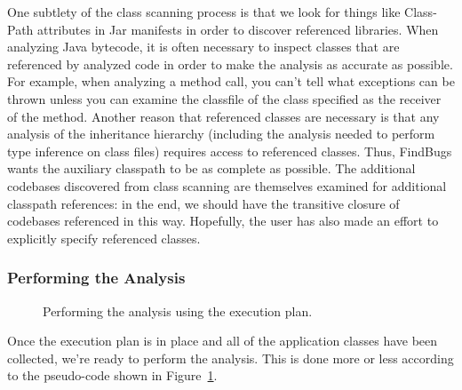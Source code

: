 \documentclass[11pt]{article}
\newcommand{\Indent}{\hskip .25in}
\newcommand{\ForEach}{{\bf for each}}
\newcommand{\Do}{{\bf do}}
\newcommand{\EndFor}{{\bf end for}}
\begin{document}
One subtlety of the class scanning process is that we look for things like
Class-Path attributes in Jar manifests in order to discover referenced
libraries.  When analyzing Java bytecode, it is often necessary to inspect
classes that are referenced by analyzed code in order to make the analysis
as accurate as possible.  For example, when analyzing a method call,
you can't tell what exceptions can be thrown unless you can examine the
classfile of the class specified as the receiver of the method.  Another reason
that referenced classes are necessary is that any analysis of the inheritance
hierarchy (including the analysis needed to perform type inference on
class files) requires access to referenced classes.  Thus, FindBugs wants
the auxiliary classpath to be as complete as possible.  The additional codebases
discovered from class scanning are themselves examined for additional classpath
references: in the end, we should have the transitive closure of codebases
referenced in this way.  Hopefully, the user has also made an effort to
explicitly specify referenced classes.

\subsubsection{Performing the Analysis}

\begin{figure}
\caption{Performing the analysis using the execution plan.}\label{fig:performingTheAnalysis}
\end{figure}

Once the execution plan is in place and all of the application classes have been collected,
we're ready to perform the analysis.  This is done more or less according to the
pseudo-code shown in Figure~\ref{fig:performingTheAnalysis}.
\end{document}

